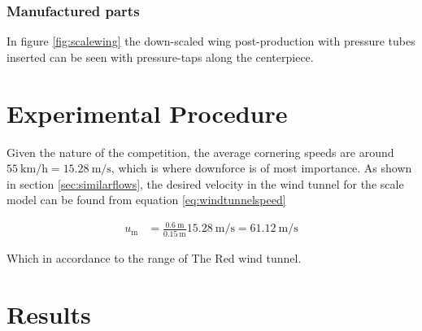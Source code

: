     \subsubsection{Manufactured parts}

      In figure \ref{fig:scalewing} the down-scaled wing post-production with pressure tubes inserted can be seen with pressure-taps along the centerpiece.

\section{Experimental Procedure}

  Given the nature of the competition, the average cornering speeds are around $\SI{55}{\kilo \meter \per \hour} = \SI{15.28}{\metre\per\second}$, which is where downforce is of most importance. As shown in section \ref{sec:similarflows}, the desired velocity in the wind tunnel for the scale model can be found from equation \ref{eq:windtunnelspeed}

  \begin{align*}
    u_\text{m} &= \frac{\SI{0.6}{\metre}}{\SI{0.15}{\metre}} \SI{15.28}{\metre\per\second} = \SI{61.12}{\metre\per\second}
  \end{align*}

  Which in accordance to the range of The Red wind tunnel.

\section{Results}
